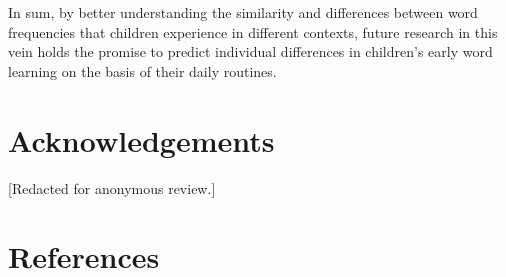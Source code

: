 \documentclass[10pt, letterpaper]{article}
\begin{document}
In sum, by better understanding the similarity and differences between
word frequencies that children experience in different contexts, future
research in this vein holds the promise to predict individual
differences in children's early word learning on the basis of their
daily routines.

\hypertarget{acknowledgements}{%
\section{Acknowledgements}\label{acknowledgements}}

{[}Redacted for anonymous review.{]}

\hypertarget{references}{%
\section{References}\label{references}}

\setlength{\parindent}{-0.1in} 
\setlength{\leftskip}{0.125in}

\noindent
\end{document}
